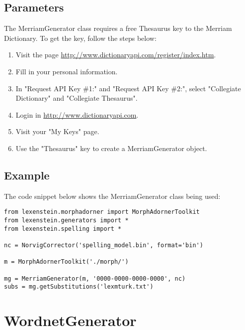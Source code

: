 \subsection{Parameters}

The MerriamGenerator class requires a free Thesaurus key to the Merriam Dictionary. To get the key, follow the steps below:

\begin{enumerate}
\item Visit the page \url{http://www.dictionaryapi.com/register/index.htm}.
\item Fill in your personal information.
\item In "Request API Key \#1:" and "Request API Key \#2:", select "Collegiate Dictionary" and "Collegiate Thesaurus".
\item Login in \url{http://www.dictionaryapi.com}.
\item Visit your "My Keys" page.
\item Use the "Thesaurus" key to create a MerriamGenerator object.
\end{enumerate}

\subsection{Example}

The code snippet below shows the MerriamGenerator class being used:

\begin{lstlisting}
from lexenstein.morphadorner import MorphAdornerToolkit
from lexenstein.generators import *
from lexenstein.spelling import *

nc = NorvigCorrector('spelling_model.bin', format='bin')

m = MorphAdornerToolkit('./morph/')

mg = MerriamGenerator(m, '0000-0000-0000-0000', nc)
subs = mg.getSubstitutions('lexmturk.txt')
\end{lstlisting}















\section{WordnetGenerator}

